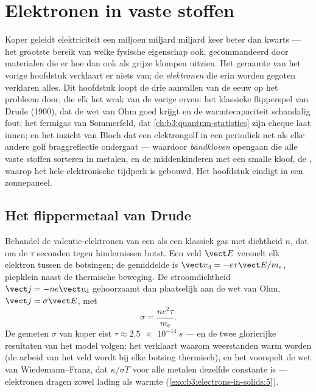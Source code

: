 \chapter{Elektronen in vaste stoffen}\label{ch:b3:electrons-in-solids}


Koper geleidt elektriciteit een miljoen miljard miljard keer beter
dan kwarts --- het grootste bereik van welke fysische eigenschap ook,
gecommandeerd door materialen die er hoe dan ook als grijze klompen uitzien. Het geraamte van
het vorige hoofdstuk verklaart er niets van; de \emph{elektronen} die erin
worden gegoten verklaren alles. Dit hoofdstuk loopt de drie aanvallen van de eeuw op
het probleem door, die elk het wrak van de vorige erven: het klassieke flipperspel
van Drude (1900), dat de wet van Ohm goed krijgt en de warmtecapaciteit
schandalig fout; het fermigas van Sommerfeld, dat
\cref{ch:b3:quantum-statistics} zijn cheque laat innen; en het inzicht van Bloch
dat een elektrongolf in een periodiek  net als elke andere golf
braggreflectie ondergaat --- waardoor \emph{bandkloven} opengaan die alle vaste stoffen
sorteren in metalen,  en de middenkinderen met een smalle kloof,
de , waarop het hele elektronische tijdperk is gebouwd. Het
hoofdstuk eindigt in een zonnepaneel.

\section{Het flippermetaal van Drude}

\begin{proposition}\label{prop:b3:electrons-in-solids:drude}
Behandel de valentie-elektronen van een  als een klassiek gas met dichtheid $n$,
dat om de $\tau$ seconden tegen hindernissen botst. Een veld $\vect E$
versnelt elk elektron tussen de botsingen; de gemiddelde \emph{}
is $\vect v_{\text{d}} = -e\tau\vect E/m_{\text{e}}$,
piepklein naast de thermische beweging. De stroomdichtheid $\vect j =
-ne\vect v_{\text{d}}$ gehoorzaamt dan plaatselijk aan de wet van Ohm,
$\vect j = \sigma\vect E$, met
\[
\sigma = \frac{ne^2\tau}{m_{\text{e}}} .
\]
De gemeten $\sigma$ van koper eist $\tau \approx \qty{2.5e-14}{s}$
--- en de twee glorierijke resultaten van het model volgen: het verklaart waarom weerstanden
warm worden (de arbeid van het veld wordt bij elke botsing thermisch), en het
voorspelt de wet van Wiedemann--Franz, dat $\kappa/\sigma T$ voor alle metalen
dezelfde constante is --- elektronen dragen zowel lading als
warmte (\cref{exo:b3:electrons-in-solids:5}).
\end{proposition}

